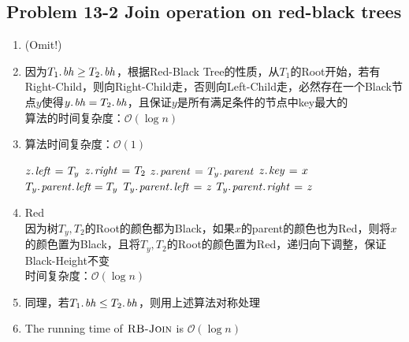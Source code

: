 \subsection*{Problem 13-2 Join operation on red-black trees}
\begin{enumerate}
	\item	(Omit!)
	\item	因为$\attrib{T_1}{bh} \geq \attrib{T_2}{bh}$，根据Red-Black Tree的性质，从$T_1$的Root开始，若有Right-Child，则向Right-Child走，否则向Left-Child走，必然存在一个Black节点$y$使得$\attrib{y}{bh} = \attrib{T_2}{bh}$，且保证$y$是所有满足条件的节点中key最大的 \\
		算法的时间复杂度：$\mathcal{O}(\log{n})$
	\item	算法时间复杂度：$\mathcal{O}(1)$ \\
		\begin{codebox}
		\li	$\attrib{z}{left} \gets T_y$
		\li	$\attrib{z}{right} \gets T_2$ 
		\li	$\attrib{z}{parent} \gets \attrib{T_y}{parent}$
		\li	$\attrib{z}{key} \gets x$
		\li	\If $\attrib{\attrib{T_y}{parent}}{left} = T_y$
		\li	\Then
				$\attrib{\attrib{T_y}{parent}}{left} \gets z$
		\li	\Else
				$\attrib{\attrib{T_y}{parent}}{right} \gets z$
		\end{codebox}
	\item	Red \\
		因为树$T_y, T_2$的Root的颜色都为Black，如果$x$的parent的颜色也为Red，则将$x$的颜色置为Black，且将$T_y, T_2$的Root的颜色置为Red，递归向下调整，保证Black-Height不变 \\
		时间复杂度：$\mathcal{O}(\log{n})$
	\item	同理，若$\attrib{T_1}{bh} \leq \attrib{T_2}{bh}$，则用上述算法对称处理
	\item	The running time of $\textnormal{\scshape RB-Join}$ is $\mathcal{O}(\log{n})$
\end{enumerate}

